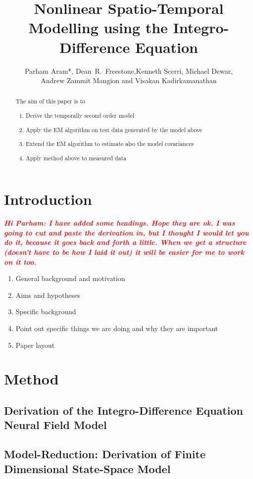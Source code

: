 \documentclass[a4paper,10pt]{article}
\title{Nonlinear Spatio-Temporal Modelling using the Integro-Difference
Equation}
\author{Parham Aram*,
        Dean~R.~Freestone,Kenneth Scerri, Michael Dewar,\\ Andrew Zammit Mangion
and Visakan Kadirkamanathan}
\newcommand{\dean}[1]{\textsf{\emph{\textbf{\textcolor{red}{#1}}}}}
\begin{document}
\maketitle

\begin{abstract}
The aim of this paper is to 	
\begin{enumerate}
	\item Derive the temporally second order model
	\item Apply the EM algorithm on test data generated by the model above
	\item Extend the EM algorithm to estimate also the model covariances
	\item Apply method above to measured data
\end{enumerate}


\end{abstract}

\section{Introduction}
\dean{Hi Parham: I have added some headings. Hope they are ok. I was going to
cut and paste the derivation in, but I thought I would let you do it, because it
goes back and forth a little. When we get a structure (doesn't have to be how I
laid it out) it will be easier for me to work on it too.}
\begin{enumerate}
	\item General background and motivation
	\item Aims and hypotheses
	\item Specific background
	\item Point out specific things we are doing and why they are important
	\item Paper layout
\end{enumerate}

\section{Method}
\subsection{Derivation of the Integro-Difference Equation Neural Field Model}

\subsection{Model-Reduction: Derivation of Finite Dimensional State-Space Model}
\end{document}
